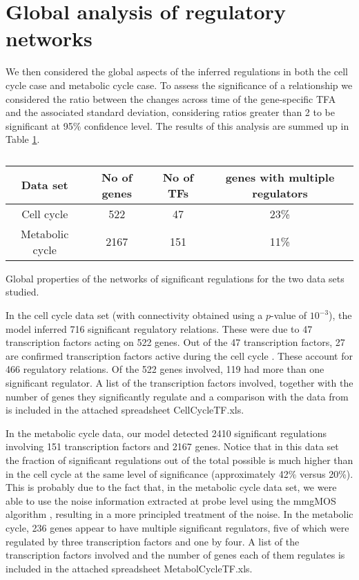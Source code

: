 \documentclass[english]{sheftech}
\begin{document}
\section{Global analysis of regulatory networks}

We then considered the global aspects of the inferred regulations
in both the cell cycle case and metabolic cycle case. To assess
the significance of a relationship we considered the ratio between the changes
across time of the gene-specific TFA and the associated standard deviation,
considering ratios greater than 2 to be significant at 95\% confidence level. 
The results of this analysis are summed up in Table \ref{global}.

\begin{table}
\small\center\begin{tabular}{|c|c|c|c|}
\hline 
Data set&
No of genes&
No of TFs&
genes with multiple regulators\tabularnewline
\hline

\hline 
Cell cycle&
522&
47&
23\%\tabularnewline
\hline 
Metabolic cycle&
2167&
151&
11\%\tabularnewline


\hline 
\end{tabular}
\vspace{0.2cm}

\caption\small{Global properties of the networks of significant regulations 
for the two data sets studied.\label{global}}
\end{table}
In the cell cycle data set (with connectivity obtained using a $p$-value
of $10^{-3}$), the model inferred 716 significant regulatory relations.
These were due to 47 transcription factors acting on 522 genes. Out
of the 47 transcription factors, 27 are confirmed transcription factors
active during the cell cycle \cite{Luscombe04}. These account for 466
regulatory relations. Of the 522 genes involved, 119 had
more than one significant regulator. A list of the transcription factors
involved, together with the number of genes they significantly regulate
and a comparison with the data from \cite{Luscombe04} is included
in the attached spreadsheet CellCycleTF.xls.

In the metabolic cycle data, our model detected 2410 significant regulations
involving 151 transcription factors and 2167 genes. Notice that in this data set
the fraction of significant regulations out of the total possible
is much higher than in the cell cycle at the same level of
significance (approximately 42\% versus 20\%). This is probably due to the fact
that, in the metabolic cycle data set, we were able to use the noise
information extracted at probe level using the mmgMOS algorithm 
\cite{Liu:mmgmos05}, resulting in a more principled treatment of the noise. 
In the metabolic
cycle, 236 genes appear to have multiple significant regulators, 
five of which were regulated
by three transcription factors and one by four.
A list of the transcription factors
involved and the number of genes each of them regulates is included
in the attached spreadsheet MetabolCycleTF.xls.
\end{document}
